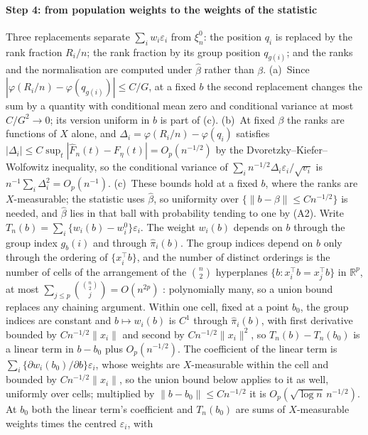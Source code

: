 \documentclass[11pt]{article}
\begin{document}
\paragraph{Step 4: from population weights to the weights of the statistic} Three replacements
separate $\sum_iw_i\varepsilon_i$ from $\xi_n^0$: the position $q_i$ is replaced by the rank fraction
$R_i/n$; the rank fraction by its group position $q_{g(i)}$; and the ranks and the normalisation are
computed under $\hat\beta$ rather than $\beta$. (a)~Since $|\varphi(R_i/n)-\varphi(q_{g(i)})|\le C/G$,
at a fixed $b$ the second replacement changes the sum by a quantity with conditional mean zero and
conditional variance at most $C/G^2\to0$; its version uniform in $b$ is part of (c). (b)~At fixed $\beta$ the ranks are functions of $X$ alone, and
$\Delta_i=\varphi(R_i/n)-\varphi(q_i)$ satisfies $|\Delta_i|\le C\sup_t|\hat F_n(t)-F_\eta(t)|=
O_p(n^{-1/2})$ by the Dvoretzky--Kiefer--Wolfowitz inequality, so the conditional variance of
$\sum_in^{-1/2}\Delta_i\varepsilon_i/\sqrt{v_i}$ is $n^{-1}\sum_i\Delta_i^2=O_p(n^{-1})$. (c)~These
bounds hold at a fixed $b$, where the ranks are $X$-measurable; the statistic uses $\hat\beta$, so
uniformity over $\{\|b-\beta\|\le Cn^{-1/2}\}$ is needed, and $\hat\beta$ lies in that ball with
probability tending to one by (A2). Write $T_n(b)=\sum_i\{w_i(b)-w_i^0\}\varepsilon_i$. The weight
$w_i(b)$ depends on $b$ through the group index $g_b(i)$ and through $\hat\pi_i(b)$. The group
indices depend on $b$ only through the ordering of $\{x_i^\top b\}$, and the number of distinct
orderings is the number of cells of the arrangement of the $\binom n2$ hyperplanes
$\{b:x_i^\top b=x_j^\top b\}$ in $\mathbb{R}^{p}$, at most $\sum_{j\le p}\binom{\binom n2}{j}=
O(n^{2p})$ \citep{cover1965geometrical}: polynomially many, so a union bound replaces any chaining
argument. Within one cell, fixed at a point $b_0$, the group indices are constant and $b\mapsto
w_i(b)$ is $C^1$ through $\hat\pi_i(b)$, with first derivative bounded by $Cn^{-1/2}\|x_i\|$ and
second by $Cn^{-1/2}\|x_i\|^2$, so $T_n(b)-T_n(b_0)$ is a linear term in $b-b_0$ plus
$O_p(n^{-1/2})$. The coefficient of the linear term is $\sum_i\{\partial w_i(b_0)/\partial b\}\varepsilon_i$,
whose weights are $X$-measurable within the cell and bounded by $Cn^{-1/2}\|x_i\|$, so the union bound
below applies to it as well, uniformly over cells; multiplied by $\|b-b_0\|\le Cn^{-1/2}$ it is
$O_p(\sqrt{\log n}\,n^{-1/2})$. At $b_0$ both the linear term's coefficient and $T_n(b_0)$ are sums of
$X$-measurable weights times the centred $\varepsilon_i$, with
\end{document}

